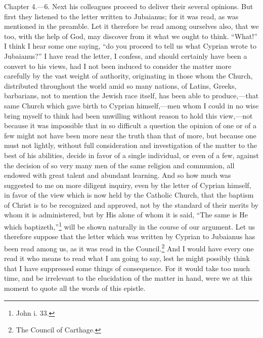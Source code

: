 
Chapter 4.—6. Next his colleagues proceed to deliver their several opinions. But first they listened to the letter written to Jubaianus; for it was read, as was mentioned in the preamble. Let it therefore be read among ourselves also, that we too, with the help of God, may discover from it what we ought to think. ``What!'' I think I hear some one saying, ``do you proceed to tell us what Cyprian wrote to Jubaianus?'' I have read the letter, I confess, and should certainly have been a convert to his views, had I not been induced to consider the matter more carefully by the vast weight of authority, originating in those whom the Church, distributed throughout the world amid so many nations, of Latins, Greeks, barbarians, not to mention the Jewish race itself, has been able to produce,—that same Church which gave birth to Cyprian himself,—men whom I could in no wise bring myself to think had been unwilling without reason to hold this view,—not because it was impossible that in so difficult a question the opinion of one or of a few might not have been more near the truth than that of more, but because one must not lightly, without full consideration and investigation of the matter to the best of his abilities, decide in favor of a single individual, or even of a few, against the decision of so very many men of the same religion and communion, all endowed with great talent and abundant learning. And so how much was suggested to me on more diligent inquiry, even by the letter of Cyprian himself, in favor of the view which is now held by the Catholic Church, that the baptism of Christ is to be recognized and approved, not by the standard of their merits by whom it is administered, but by His alone of whom it is said, ``The same is He which baptizeth,''\footnote{\par  John i. 33.} will be shown naturally in the course of our argument. Let us therefore suppose that the letter which was written by Cyprian to Jubaianus has been read among us, as it was read in the Council.\footnote{\par  The Council of Carthage.} And I would have every one read it who means to read what I am going to say, lest he might possibly think that I have suppressed some things of consequence. For it would take too much time, and be irrelevant to the elucidation of the matter in hand, were we at this moment to quote all the words of this epistle.


